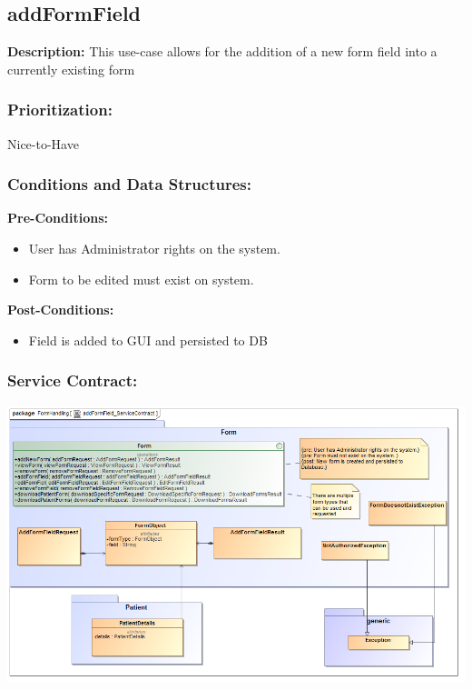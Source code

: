 





\subsection{addFormField}
\textbf{Description:}
This use-case allows for the addition of a new form field into a currently existing form
\subsubsection{Prioritization:}
Nice-to-Have
\subsubsection{Conditions and Data Structures:}
\textbf{Pre-Conditions:}
\begin{itemize}
	\item User has Administrator rights on the system.
	\item Form to be edited must exist on system.
\end{itemize}

\textbf{Post-Conditions:}	
\begin{itemize}
	\item Field is added to GUI and persisted to DB
\end{itemize}
\subsubsection{Service Contract:} 
\includegraphics[width=1\linewidth]{./Graphics/FormUseCaseDiagrams/addFormField_ServiceContract}
